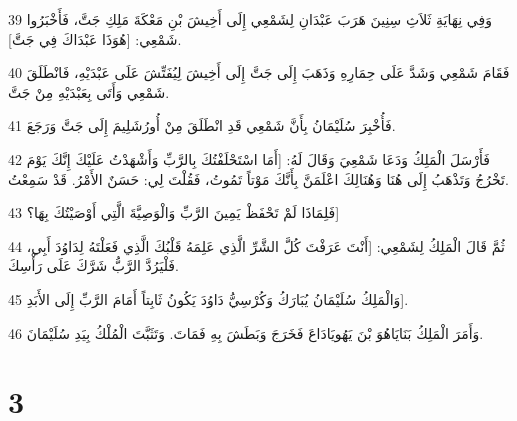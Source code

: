 \par 39 وَفِي نِهَايَةِ ثَلاَثِ سِنِينَ هَرَبَ عَبْدَانِ لِشَمْعِي إِلَى أَخِيشَ بْنِ مَعْكَةَ مَلِكِ جَتَّ، فَأَخْبَرُوا شَمْعِي: [هُوَذَا عَبْدَاكَ فِي جَتَّ].
\par 40 فَقَامَ شَمْعِي وَشَدَّ عَلَى حِمَارِهِ وَذَهَبَ إِلَى جَتَّ إِلَى أَخِيشَ لِيُفَتِّشَ عَلَى عَبْدَيْهِ، فَانْطَلَقَ شَمْعِي وَأَتَى بِعَبْدَيْهِ مِنْ جَتَّ.
\par 41 فَأُخْبِرَ سُلَيْمَانُ بِأَنَّ شَمْعِي قَدِ انْطَلَقَ مِنْ أُورُشَلِيمَ إِلَى جَتَّ وَرَجَعَ.
\par 42 فَأَرْسَلَ الْمَلِكُ وَدَعَا شَمْعِيَ وَقَالَ لَهُ: [أَمَا اسْتَحْلَفْتُكَ بِالرَّبِّ وَأَشْهَدْتُ عَلَيْكَ إِنَّكَ يَوْمَ تَخْرُجُ وَتَذْهَبُ إِلَى هُنَا وَهُنَالِكَ اعْلَمَنَّ بِأَنَّكَ مَوْتاً تَمُوتُ، فَقُلْتَ لِي: حَسَنٌ الأَمْرُ. قَدْ سَمِعْتُ.
\par 43 فَلِمَاذَا لَمْ تَحْفَظْ يَمِينَ الرَّبِّ وَالْوَصِيَّةَ الَّتِي أَوْصَيْتُكَ بِهَا؟]
\par 44 ثُمَّ قَالَ الْمَلِكُ لِشَمْعِي: [أَنْتَ عَرَفْتَ كُلَّ الشَّرِّ الَّذِي عَلِمَهُ قَلْبُكَ الَّذِي فَعَلْتَهُ لِدَاوُدَ أَبِي، فَلْيَرُدَّ الرَّبُّ شَرَّكَ عَلَى رَأْسِكَ.
\par 45 وَالْمَلِكُ سُلَيْمَانُ يُبَارَكُ وَكُرْسِيُّ دَاوُدَ يَكُونُ ثَابِتاً أَمَامَ الرَّبِّ إِلَى الأَبَدِ].
\par 46 وَأَمَرَ الْمَلِكُ بَنَايَاهُوَ بْنَ يَهُويَادَاعَ فَخَرَجَ وَبَطَشَ بِهِ فَمَاتَ. وَتَثَبَّتَ الْمُلْكُ بِيَدِ سُلَيْمَانَ.

\chapter{3}


